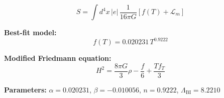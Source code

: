 
\begin{equation}
  S = \int d^4x \, |e| \, \frac{1}{16\pi G} \left[ f(T) + \mathcal{L}_m \right]
\end{equation}

\textbf{Best-fit model:}
\begin{equation}
  f(T) = 0.020231 \, T^{0.9222}
\end{equation}

\textbf{Modified Friedmann equation:}
\begin{equation}
  H^2 = \frac{8\pi G}{3} \rho - \frac{f}{6} + \frac{T f_T}{3}
\end{equation}

\textbf{Parameters:}
$\alpha = 0.020231$, \quad
$\beta = -0.010056$, \quad
$n = 0.9222$, \quad
$\Lambda_{\text{BI}} = 8.2210$
